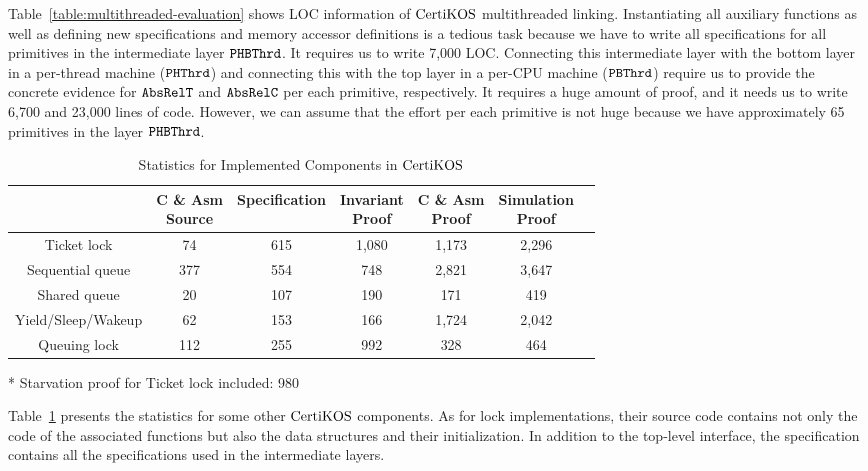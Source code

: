 Table~\ref{table:multithreaded-evaluation} shows LOC information of $\mathrm{CertiKOS}$ multithreaded linking.
Instantiating all auxiliary functions as well as defining new specifications and memory accessor definitions is a tedious task because
we have to write all specifications for all primitives in the intermediate layer ${{\mathrm{\texttt{PHBThrd}}}}$. 
It requires us to write  7,000 LOC. 
Connecting this   intermediate layer with the bottom layer in a per-thread machine (${{\mathrm{\texttt{PHThrd}}}}$) and 
connecting this with the top layer in a per-CPU machine (${{\mathrm{\texttt{PBThrd}}}}$) require us 
to provide the concrete evidence for ${{\mathrm{\texttt{AbsRelT}}}}$ and ${{\mathrm{\texttt{AbsRelC}}}}$ per each primitive, respectively.
It requires a huge amount of proof, and it needs us to write 6,700  and 23,000 lines of code.
However,  we can assume that the effort per each primitive is not huge because 
 we have approximately 65 primitives in the layer ${{\mathrm{\texttt{PHBThrd}}}}$.

\begin{table}
\begin{center}
\renewcommand{\arraystretch}{1.1}
\setlength{\tabcolsep}{0.3em}
\begin{tabular}{|c|c|c|c|c|c|c|}
\hline
 & \makecell{ C \& Asm \\Source} & Specification & \makecell{Invariant \\ Proof} & \makecell{C \& Asm \\Proof} & \makecell{Simulation \\ Proof} \\
\hline
Ticket lock & 74 & 615 & 1,080 & 1,173 & 2,296 \\
\hline
Sequential queue & 377 & 554 & 748 & 2,821& 3,647 \\
\hline
Shared queue &  20 & 107 & 190 & 171& 419\\
\hline
Yield/Sleep/Wakeup & 62 & 153 & 166 & 1,724 & 2,042 \\
\hline
Queuing lock & 112 & 255 & 992 & 328 & 464\\
\hline
\end{tabular}
\newline
\end{center}
\begin{flushright}
* Starvation proof for Ticket lock included: 980\\
\end{flushright}
\caption{Statistics for Implemented Components in $\mathrm{CertiKOS}$}
\label{table:certikos-evaluation}
\hrulefill
\end{table}
Table~\ref{table:certikos-evaluation} presents  the statistics for some other  $\mathrm{CertiKOS}$ components.
 As for lock implementations, their source code contains not only the code of the associated functions but also the data structures and their initialization. In addition to the top-level interface, the specification contains all the specifications used in the intermediate layers.

